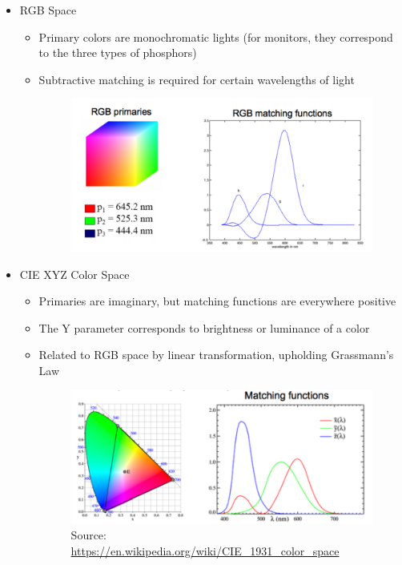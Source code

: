 \documentclass{article}
\begin{document}
    \begin{itemize}
    \item RGB Space
     \begin{itemize}
     \item Primary colors are monochromatic lights (for monitors, they correspond to the three types of phosphors)
     \item Subtractive matching is required for certain wavelengths of light

	  \begin{figure}[h!]
      \centering
      \includegraphics[width=10cm]{rgb1.png}
      \caption{}
      \end{figure}
     
     \end{itemize}
   
    \item CIE XYZ Color Space
     \begin{itemize}
     \item Primaries are imaginary, but matching functions are everywhere positive 
     \item The Y parameter corresponds to brightness or luminance of a color
     \item Related to RGB space by linear transformation, upholding Grassmann's Law
     
	  \begin{figure}[h!]
      \centering
      \includegraphics[width=10cm]{xyz1.png}
      \caption{Source: \url{https://en.wikipedia.org/wiki/CIE_1931_color_space}}
      \end{figure}
     
     \end{itemize}
    \end{itemize}
\end{document}
